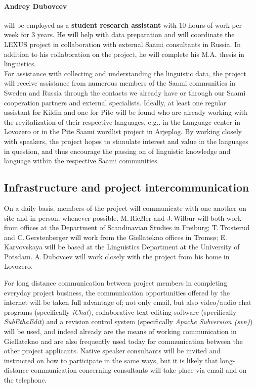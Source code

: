 \documentclass[a4paper,12pt]{article}
\begin{document}
{{\paragraph{Andrey Dubovcev} will be employed as a \textbf{student research assistant} with 10 hours of work per week for 3 years. He will help with data preparation and will coordinate the LEXUS project in collaboration with external Saami consultants in Russia. In addition to his collaboration on the project, he will complete his M.A. thesis in linguistics.\\

For assistance with collecting and understanding the linguistic data, the project will receive assistance from numerous members of the Saami communities in Sweden and Russia through the contacts we already have or through our Saami cooperation partners and external specialists. 
Ideally, at least one regular assistant for Kildin and one for Pite will be found who are already working with the revitalization of their respective languages, e.g.. in the Language center in Lovozero or in the Pite Saami wordlist project in Arjeplog. By working closely with speakers, the project hopes to stimulate interest and value in the languages in question, and thus encourage the passing on of linguistic knowledge and language within the respective Saami communities.

\subsection{Infrastructure and project intercommunication}
On a daily basis, members of the project will communicate with one another on site and in person, whenever possible. M.\,Rießler and J.\,Wilbur will both work from offices at the Department of Scandinavian Studies in Freiburg; T.\,Trosterud and C.\,Gerstenberger will work from the Giellatekno offices in Tromsø; E.\,Karvovskaya will be based at the Linguistics Department at the University of Potsdam. A.\,Dubovcev will work closely with the project from his home in Lovozero.

For long distance communication between project members in completing everyday project business, the communication opportunities offered by the internet will be taken full advantage of; not only email, but also video/audio chat programs (specifically \textit{iChat}), collaborative text editing software (specifically \textit{SubEthaEdit}) and a revision control system (specifically \textit{Apache Subversion (svn)}) will be used, and indeed already are the means of working communication in Giellatekno and are also frequently used today for communication between the other project applicants. Native speaker consultants will be invited and instructed on how to participate in the same ways, but it is likely that long-distance communication concerning consultants will take place via email and on the telephone.

}}
\end{document}
